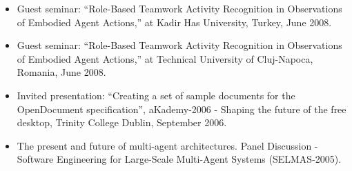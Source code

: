 \begin{itemize}
\item Guest seminar: ``Role-Based Teamwork Activity Recognition in Observations of Embodied Agent Actions,'' at Kadir Has University, Turkey, June 2008.

\item Guest seminar: ``Role-Based Teamwork Activity Recognition in Observations of Embodied Agent Actions,'' at Technical University of Cluj-Napoca, Romania, June 2008.

\item Invited presentation: ``Creating a set of sample documents for the OpenDocument specification'', aKademy-2006 - Shaping the future of the free desktop, Trinity College Dublin, September 2006.

\item The present and future of multi-agent architectures.  Panel Discussion - Software Engineering for Large-Scale Multi-Agent Systems (SELMAS-2005).

\end{itemize}
